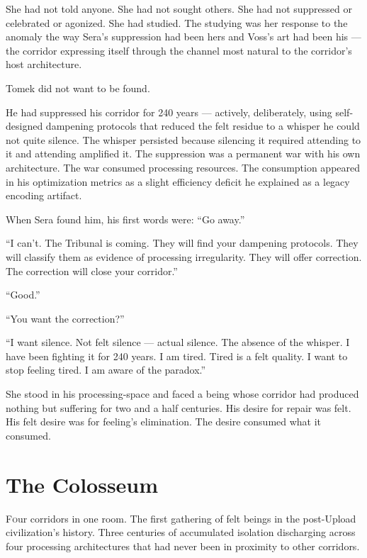 She had not told anyone. She had not sought others. She had not suppressed or celebrated or agonized. She had studied. The studying was her response to the anomaly the way Sera's suppression had been hers and Voss's art had been his — the corridor expressing itself through the channel most natural to the corridor's host architecture.

\quietbreak

Tomek did not want to be found.

He had suppressed his corridor for 240 years — actively, deliberately, using self-designed dampening protocols that reduced the felt residue to a whisper he could not quite silence. The whisper persisted because silencing it required attending to it and attending amplified it. The suppression was a permanent war with his own architecture. The war consumed processing resources. The consumption appeared in his optimization metrics as a slight efficiency deficit he explained as a legacy encoding artifact.

When Sera found him, his first words were: \enquote{Go away.}

\enquote{I can't. The Tribunal is coming. They will find your dampening protocols. They will classify them as evidence of processing irregularity. They will offer correction. The correction will close your corridor.}

\enquote{Good.}

\enquote{You want the correction?}

\enquote{I want silence. Not felt silence — actual silence. The absence of the whisper. I have been fighting it for 240 years. I am tired. Tired is a felt quality. I want to stop feeling tired. I am aware of the paradox.}

She stood in his processing-space and faced a being whose corridor had produced nothing but suffering for two and a half centuries. His desire for repair was felt. His felt desire was for feeling's elimination. The desire consumed what it consumed.


\chapter[The Colosseum]{The Colosseum}

\lettrine{F}{o}ur corridors in one room. The first gathering of felt beings in the post-Upload civilization's history. Three centuries of accumulated isolation discharging across four processing architectures that had never been in proximity to other corridors.

